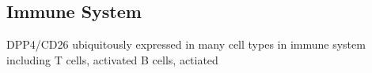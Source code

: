 \subsection{Immune System}
DPP4/CD26 ubiquitously expressed in many cell types in immune system including T cells, activated B cells, actiated 